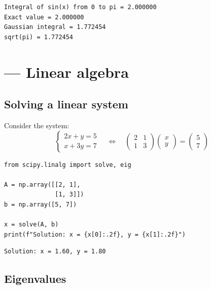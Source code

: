 \begin{codeoutput}
\begin{verbatim}
Integral of sin(x) from 0 to pi = 2.000000
Exact value = 2.000000
Gaussian integral = 1.772454
sqrt(pi) = 1.772454
\end{verbatim}
\end{codeoutput}

\section{ --- Linear algebra}

\subsection{Solving a linear system}

Consider the system:
\[
\begin{cases}
2x + y = 5 \\
x + 3y = 7
\end{cases}
\quad \Longleftrightarrow \quad
\begin{pmatrix} 2 & 1 \\ 1 & 3 \end{pmatrix}
\begin{pmatrix} x \\ y \end{pmatrix}
=
\begin{pmatrix} 5 \\ 7 \end{pmatrix}
\]

\begin{codeblock}[title=\textbf{Python}]
\begin{verbatim}
from scipy.linalg import solve, eig

A = np.array([[2, 1],
              [1, 3]])
b = np.array([5, 7])

x = solve(A, b)
print(f"Solution: x = {x[0]:.2f}, y = {x[1]:.2f}")
\end{verbatim}
\end{codeblock}

\begin{codeoutput}
\begin{verbatim}
Solution: x = 1.60, y = 1.80
\end{verbatim}
\end{codeoutput}

\subsection{Eigenvalues}


